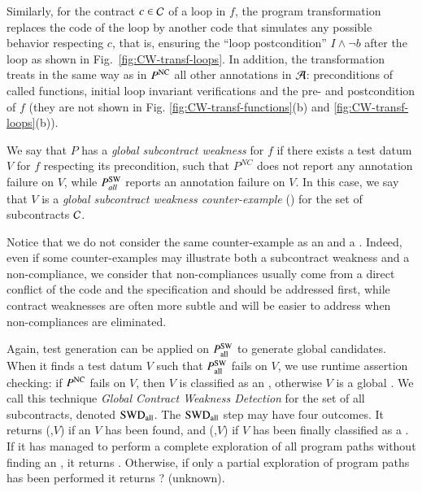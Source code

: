 Similarly, for the contract $c\in{\ensuremath\mathcal{C}}$ of a loop in $f$, 
the program transformation  
replaces the code of the loop by 
another code that simulates any possible behavior respecting $c$, that is, 
ensuring the ``loop postcondition'' $I\wedge \neg b$ after the loop as shown in Fig.~\ref{fig:CW-transf-loops}.
In addition, the transformation treats in the same way as in $P^{\mathrm{NC}}$
all other annotations in ${\mathcal{A}}$:
preconditions of called functions, initial loop invariant verifications 
and the  pre- and postcondition of $f$
(they are not shown 
in Fig. \ref{fig:CW-transf-functions}(b) and \ref{fig:CW-transf-loops}(b)).

\begin{definition} 
\label{def:CW}
We say that $P$ has a \emph{global subcontract weakness} for $f$ 
if there exists a test datum $V$ for $f$ respecting its precondition,
such that $P^{NC}$ does not report any annotation failure on $V$,
while $P_{all}^{\mathrm{SW}}$ reports an annotation failure on $V$.
In this case, we say that $V$ is a 
\emph{global subcontract weakness counter-example} (\CWCE)
for the set  of subcontracts ${\mathcal{C}}$.
\end{definition}

Notice that we do not consider the same counter-example as an \NCCE  and 
a \CWCE. Indeed, even if some counter-examples may illustrate both a
subcontract weakness and a non-compliance, we consider that
non-compliances usually come
from a direct conflict of the code and the specification
and should be addressed first, while 
contract weaknesses are often more subtle and will be
easier to address when non-compliances are eliminated.

Again, test generation can be applied on  $P_{\mathrm{all}}^{\mathrm{SW}}$ to generate
global \CWCE candidates. When it finds a test datum $V$ such that 
$P_{\mathrm{all}}^{\mathrm{SW}}$ fails on $V$, we use runtime assertion checking:
if $P^{\mathrm{NC}}$ fails on $V$, then
$V$ is classified as an \NCCE, otherwise  $V$ is a global \CWCE.
We call this technique \emph{Global Contract Weakness Detection} for the set of 
all subcontracts, denoted $\mathrm{SWD}_{\mathrm{all}}$. 
The $\mathrm{SWD}_{\mathrm{all}}$ step may have four outcomes. 
It returns (\nc,$V$) if an \NCCE $V$ has been found,
and  (\cw,$V$) if $V$ has been finally classified as a \CWCE.
If it has managed to perform a complete exploration 
of all program paths without finding an \CWCE, it returns \no.
Otherwise, if only a partial exploration of program paths
has been performed it returns \textsf{?} (unknown).


